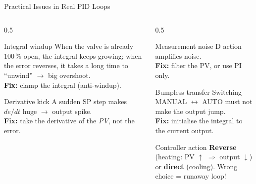 \documentclass[aspectratio=169]{beamer}
\begin{document}
	\begin{frame}{Practical Issues in Real PID Loops}
		\begin{columns}[T]
			\begin{column}{0.5\textwidth}
				\begin{block}{Integral windup}
					\small When the valve is already 100\,\% open, the integral keeps growing; when the error reverses, it takes a long time to ``unwind'' $\rightarrow$ big overshoot.\\
					\textbf{Fix:} clamp the integral (anti-windup).
				\end{block}
				\begin{block}{Derivative kick}
					\small A sudden SP step makes $de/dt$ huge $\rightarrow$ output spike.\\
					\textbf{Fix:} take the derivative of the \emph{PV}, not the error.
				\end{block}
			\end{column}
			\begin{column}{0.5\textwidth}
				\begin{block}{Measurement noise}
					\small D action amplifies noise.\\
					\textbf{Fix:} filter the PV, or use PI only.
				\end{block}
				\begin{block}{Bumpless transfer}
					\small Switching MANUAL $\leftrightarrow$ AUTO must not make the output jump.\\
					\textbf{Fix:} initialise the integral to the current output.
				\end{block}
				\begin{block}{Controller action}
					\small \textbf{Reverse} (heating: PV $\uparrow$ $\Rightarrow$ output $\downarrow$) or \textbf{direct} (cooling). Wrong choice = runaway loop!
				\end{block}
			\end{column}
		\end{columns}
	\end{frame}
\end{document}
